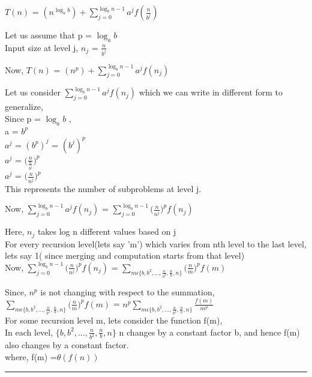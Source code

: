 \documentclass[11pt]{article}
\newenvironment{proof}{{\bf Proof:  }}{\hfill\rule{2mm}{2mm}}
\begin{document}
\begin{proof}
$T(n)$ = $(n^{\log_a b}) + \sum_{j=0}^{\log_b n - 1} {a^{j}}f\left(\frac{n}{b^{j}}\right)$

Let us assume that p = ${\log_a b}$ \\
Input size at level j, ${n_j}$ = $\frac{n}{b^{j}}$

Now, $T(n)$ = $(n^p) + \sum_{j=0}^{\log_b n - 1} {a^{j}}f\left(n_j\right)$

Let us consider $\sum_{j=0}^{\log_b n - 1} {a^{j}}f\left(n_j\right)$ which we can write in different form to generalize, \\

\centering Since p = ${\log_a b}$ ,\\
 a = ${b^{p}}$\\
 $a^{j}$ = ${({b^{p}})^j}$ = ${({b^{j}})^p}$ \\
 $a^{j}$ = ${\biggl(\frac{n}{\frac{n}{b^{j}}}\biggr)^{p}}$ \\ 
 $a^{j}$ = ${\biggl(\frac{n}{n^{j}}\biggr)^{p}}$ \\
 
 This represents the number of subproblems at level j.
 
 Now, $\sum_{j=0}^{\log_b n - 1} {a^{j}}f\left(n_j\right)$ = $\sum_{j=0}^{\log_b n - 1} {{\biggl(\frac{n}{n^{j}}\biggr)^{p}}}f\left(n_j\right)$ 
 
 Here, $n_j$ takes log n different values based on j\\
 For every recursion level(lets say 'm') which varies from nth level to the last level, lets say 1( since merging and computation starts from that level) \\
 
 Now, $\sum_{j=0}^{\log_b n - 1} {{\biggl(\frac{n}{n^{j}}\biggr)^{p}}}f\left(n_j\right)$ = $\sum_{m \epsilon \{ b , b^{2} , . . . ,\frac{n}{b^{2}},\frac{n}{b}, n \}} {{\biggl(\frac{n}{m}\biggr)^{p}}}f\left(m \right)$ 
 
 Since, $n^{p}$ is not changing with respect to the summation,\\
 $\sum_{m \epsilon \{ b , b^{2} , . . . ,\frac{n}{b^{2}},\frac{n}{b}, n \}} {{\biggl(\frac{n}{m}\biggr)^{p}}}f\left(m \right)$ =  $n^{p} \sum_{m \epsilon \{ b , b^{2} , . . . ,\frac{n}{b^{2}},\frac{n}{b}, n \}} \frac{f\left(m \right)}{m^{p}}$ \\
 
For some recursion level m, lets consider the function f(m), \\
In each level, $\{ b , b^{2} , . . . ,\frac{n}{b^{2}},\frac{n}{b}, n \}$  n changes by a constant factor b, and hence f(m) also changes by a constant factor.\\
where, f(m) =$ \theta ( f(n)) $  \\


\end{proof}
\end{document}
